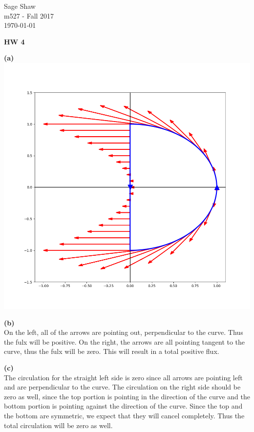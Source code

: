 \documentclass[12pt]{article}
\newcommand{\problem}[1]{\hspace{-4 ex} \large \textbf{#1}\\}
\begin{document}
	\thispagestyle{empty}
	
	\begin{flushright}
		Sage Shaw \\
		m527 - Fall 2017 \\
		\today
	\end{flushright}
	
{\large \textbf{HW 4}}\bigbreak

\problem{(a)}
\includegraphics[width=1.1\textwidth]{hw4_figure_1}

\problem{(b)}

	On the left, all of the arrows are pointing out, perpendicular to the curve. Thus the fulx will be positive. On the right, the arrows are all pointing tangent to the curve, thus the fulx will be zero. This will result in a total positive flux.

\problem{(c)}
	
	The circulation for the straight left side is zero since all arrows are pointing left and are perpendicular to the curve. The circulation on the right side should be zero as well, since the top portion is pointing in the direction of the curve and the bottom portion is pointing against the direction of the curve. Since the top and the bottom are symmetric, we expect that they will cancel completely. Thus the total circulation will be zero as well.
	
\end{document}
